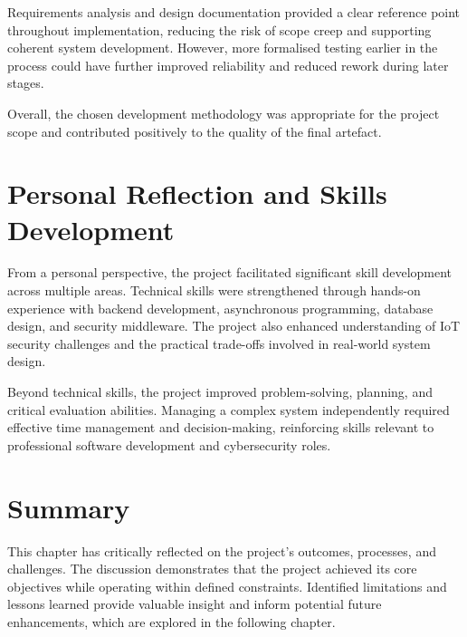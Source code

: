 Requirements analysis and design documentation provided a clear reference point throughout implementation, reducing the risk of scope creep and supporting coherent system development. However, more formalised testing earlier in the process could have further improved reliability and reduced rework during later stages.

Overall, the chosen development methodology was appropriate for the project scope and contributed positively to the quality of the final artefact.

\section{Personal Reflection and Skills Development}

From a personal perspective, the project facilitated significant skill development across multiple areas. Technical skills were strengthened through hands-on experience with backend development, asynchronous programming, database design, and security middleware. The project also enhanced understanding of IoT security challenges and the practical trade-offs involved in real-world system design.

Beyond technical skills, the project improved problem-solving, planning, and critical evaluation abilities. Managing a complex system independently required effective time management and decision-making, reinforcing skills relevant to professional software development and cybersecurity roles.

\section{Summary}

This chapter has critically reflected on the project's outcomes, processes, and challenges. The discussion demonstrates that the project achieved its core objectives while operating within defined constraints. Identified limitations and lessons learned provide valuable insight and inform potential future enhancements, which are explored in the following chapter.
